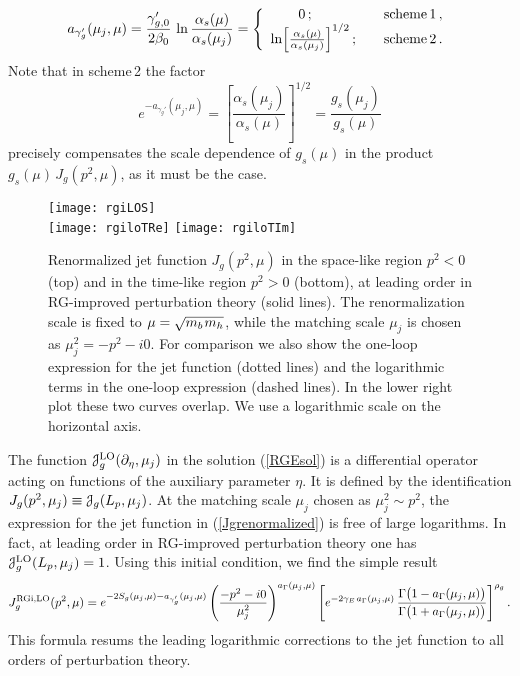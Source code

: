 \documentclass[12pt]{article}
\newcommand{\J}{{\EuScript J}}
\newcommand{\spac}{{\hspace{0.3mm}}}
\numberwithin{equation}{section}
\begin{document}
\begin{equation}
   a_{\gamma_g'}(\mu_j,\mu) = \frac{\gamma_{g,0}'}{2\beta_0}\,\ln\frac{\alpha_s(\mu)}{\alpha_s(\mu_j)}
   = \left\{ \begin{array}{ll}
    \hspace{7mm} 0 \,; & \quad\text{scheme\,1} \,, \\
    \ln\!\left[ \frac{\alpha_s(\mu)}{\alpha_s(\mu_j)} \right]^{1/2} ; & \quad\text{scheme\,2} \,.
    \end{array} \right.
\end{equation}
Note that in scheme\,2 the factor
\begin{equation}
   e^{-a_{\gamma_g'}(\mu_j,\mu)}
   = \left[ \frac{\alpha_s(\mu_j)}{\alpha_s(\mu)} \right]^{1/2} 
    = \frac{g_s(\mu_j)}{g_s(\mu)} 
\end{equation}
precisely compensates the scale dependence of $g_s(\mu)$ in the product $g_s(\mu)\,J_g(p^2,\mu)$, as it must be the case.

\begin{figure}[t]
\begin{center}
\texttt{[image: rgiLOS]} \\
\texttt{[image: rgiloTRe]} \quad
\texttt{[image: rgiloTIm]}
\caption{\label{fig:JRGEfig} 
Renormalized jet function $J_g(p^2,\mu)$ in the space-like region $p^2<0$ (top) and in the time-like region $p^2>0$ (bottom), at leading order in RG-improved perturbation theory (solid lines). The renormalization scale is fixed to $\mu=\sqrt{m_b\spac m_h}$, while the matching scale $\mu_j$ is chosen as $\mu_j^2=-p^2-i0$. For comparison we also show the one-loop expression for the jet function (dotted lines) and the logarithmic terms in the one-loop expression (dashed lines). In the lower right plot these two curves overlap. We use a logarithmic scale on the horizontal axis.}
\end{center}
\end{figure}

The function $\J_g^{\text{LO}}(\partial_\eta,\mu_j)$ in the solution (\ref{RGEsol}) is a differential operator acting on functions of the auxiliary parameter $\eta$. It is defined by the identification $J_g(p^2,\mu_j)\equiv \J_g(L_p,\mu_j)$. At the matching scale $\mu_j$ chosen as $\mu_j^2\sim p^2$, the expression for the jet function in (\ref{Jgrenormalized}) is free of large logarithms. In fact, at leading order in RG-improved perturbation theory one has $\J_g^{\text{LO}}(L_p,\mu_j)=1$. Using this initial condition, we find the simple result
\begin{equation}
   J_g^{\text{RGi,LO}}(p^2,\mu)
   = e^{-2S_g(\mu_j,\mu)-a_{\gamma_g'}(\mu_j,\mu)} \left( \frac{-p^2-i0}{\mu_j^2} \right)^{a_\Gamma(\mu_j,\mu)} 
    \left[ e^{-2\gamma_E\spac a_\Gamma(\mu_j,\mu)}\,
    \frac{\Gamma\big(1-a_\Gamma(\mu_j,\mu)\big)}{\Gamma\big(1+a_\Gamma(\mu_j,\mu)\big)} \right]^{\rho_g} .
\end{equation}
This formula resums the leading logarithmic corrections to the jet function to all orders of perturbation theory.
\end{document}
